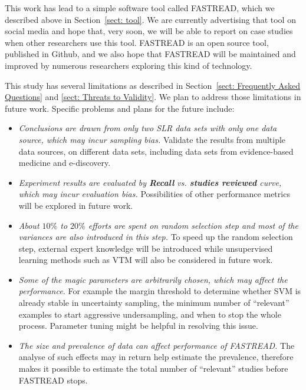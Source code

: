 \documentclass{svjour3}
\theoremstyle{break}
\begin{document}
This work has lead to a simple software tool called FASTREAD, which
we described above in Section~\ref{sect: tool}. We are currently advertising
that tool on social media and hope that, very soon,
we will be  able to report on
case studies when other researchers use this tool. FASTREAD is
an open source tool, published in Github, and we also hope
that FASTREAD will be maintained and improved by numerous 
researchers exploring this kind of technology. 

This study has several limitations as described in Section~\ref{sect: Frequently Asked Questions} and \ref{sect: Threats to Validity}. We plan to address those limitations in future work. Specific problems and plans for the future include:

\begin{itemize}

\item
{\em Conclusions are drawn from only two SLR data sets with only one data source, which may incur sampling bias.} Validate the results from multiple data sources, on different data sets, including data sets from evidence-based medicine and e-discovery.

\item
{\em Experiment results are evaluated by \textbf{Recall} vs. \textbf{studies reviewed} curve, which may incur evaluation bias.} Possibilities of other performance metrics will be explored in future work.

\item
{\em About $10\%$ to $20\%$ efforts are spent on random selection step and most of the variances are also introduced in this step.} To speed up the random selection step, external expert knowledge will be introduced while unsupervised learning methods such as VTM will also be considered in future work. 

\item
{\em Some of the magic parameters are arbitrarily chosen, which may affect the performance.} For example the margin threshold to determine whether SVM is already stable in uncertainty sampling, the minimum number of ``relevant'' examples to start aggressive undersampling, and when to stop the whole process. Parameter tuning might be helpful in resolving this issue.

\item
{\em The size and prevalence of data can affect performance of FASTREAD.} The analyse of such effects may in return help estimate the prevalence, therefore makes it possible to estimate the total number of ``relevant'' studies before FASTREAD stops.


\end{itemize}
\end{document}
